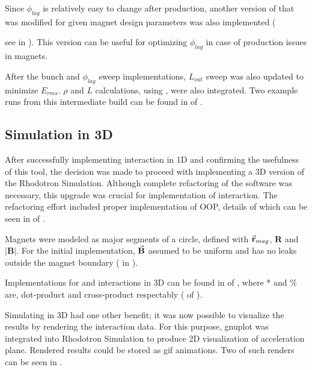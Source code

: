 \documentclass[a4paper,oneside,12pt]{report}
\numberwithin{equation}{chapter}
\begin{document}
\vspace{-15pt}
Since $\phi_{lag}$ is relatively easy to change after production, another version of  that was modified for given magnet design parameters was also implemented ({see  in ). 
This version can be useful for optimizing $\phi_{lag}$ in case of production issues in magnets. 

After the bunch and $\phi_{lag}$ sweep implementations, $L_{out}$ sweep was also updated to minimize $E_{rms}$. $\rho$ and $L$ calculations, using , were also integrated. 
Two example runs from this intermediate build can be found in  of .

\subsection{Simulation in 3D}
After successfully implementing \eE interaction in 1D and confirming the usefulness of this tool, the decision was made to proceed with implementing a 3D version of the Rhodotron Simulation.
Although complete refactoring of the software was necessary, this upgrade was crucial for implementation of \eB interaction.
The refactoring effort included proper implementation of OOP, details of which can be seen in  of .

Magnets were modeled as major segments of a circle, defined with $\vec{\textbf{r}}_{mag}$, $\textbf{R}$ and $|\textbf{B}|$. 
For the initial implementation, $\vec{\textbf{B}}$ assumed to be uniform and has no leaks outside the magnet boundary ( in ).

Implementations for \eE and \eB interactions in 3D can be found in  of , 
where * and \% are, dot-product and cross-product respectably ( of ).

Simulating in 3D had one other benefit; it was now possible to visualize the results by rendering the interaction data. 
For this purpose, gnuplot was integrated into Rhodotron Simulation to produce 2D visualization of acceleration plane. 
Rendered results could be stored as gif animations. 
Two of such renders can be seen in .

}
\end{document}
